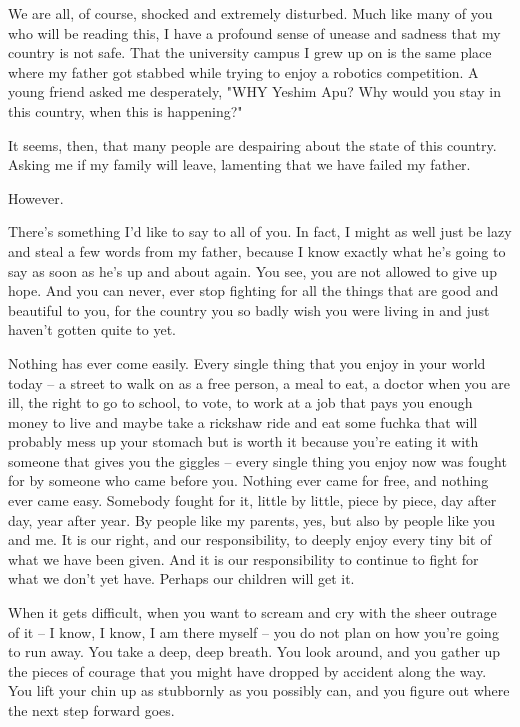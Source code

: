 \documentclass[a4paper,10 pt,addpoints]{exam}
\begin{document}
\begin{center}
\fbox{\fbox{\parbox{5.5in}{\centering  }}}
\end{center}
We are all, of course, shocked and extremely disturbed. Much like many of you who will be reading this, I have a profound sense of unease and sadness that my country is not safe. That the university campus I grew up on is the same place where my father got stabbed while trying to enjoy a robotics competition. A young friend asked me desperately, "WHY Yeshim Apu? Why would you stay in this country, when this is happening?"

It seems, then, that many people are despairing about the state of this country. Asking me if my family will leave, lamenting that we have failed my father.

However.

There's something I'd like to say to all of you. In fact, I might as well just be lazy and steal a few words from my father, because I know exactly what he's going to say as soon as he's up and about again. You see, you are not allowed to give up hope. And you can never, ever stop fighting for all the things that are good and beautiful to you, for the country you so badly wish you were living in and just haven't gotten quite to yet.

Nothing has ever come easily. Every single thing that you enjoy in your world today – a street to walk on as a free person, a meal to eat, a doctor when you are ill, the right to go to school, to vote, to work at a job that pays you enough money to live and maybe take a rickshaw ride and eat some fuchka that will probably mess up your stomach but is worth it because you're eating it with someone that gives you the giggles – every single thing you enjoy now was fought for by someone who came before you. Nothing ever came for free, and nothing ever came easy. Somebody fought for it, little by little, piece by piece, day after day, year after year. By people like my parents, yes, but also by people like you and me. It is our right, and our responsibility, to deeply enjoy every tiny bit of what we have been given. And it is our responsibility to continue to fight for what we don't yet have. Perhaps our children will get it.

When it gets difficult, when you want to scream and cry with the sheer outrage of it –  I know, I know, I am there myself – you do not plan on how you're going to run away. You take a deep, deep breath. You look around, and you gather up the pieces of courage that you might have dropped by accident along the way. You lift your chin up as stubbornly as you possibly can, and you figure out where the next step forward goes.
\end{document}
